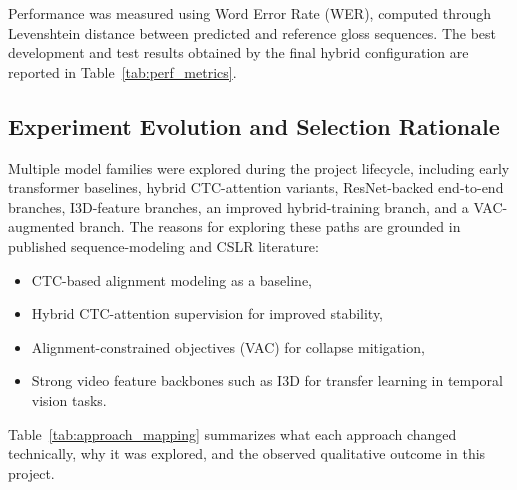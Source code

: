 Performance was measured using Word Error Rate (WER), computed through Levenshtein distance between predicted and reference gloss sequences. The best development and test results obtained by the final hybrid configuration are reported in Table~\ref{tab:perf_metrics}.

\subsection{Experiment Evolution and Selection Rationale}

Multiple model families were explored during the project lifecycle, including early transformer baselines, hybrid CTC-attention variants, ResNet-backed end-to-end branches, I3D-feature branches, an improved hybrid-training branch, and a VAC-augmented branch. The reasons for exploring these paths are grounded in published sequence-modeling and CSLR literature:
\begin{itemize}
    \item CTC-based alignment modeling as a baseline,\cite{graves2006connectionist}
    \item Hybrid CTC-attention supervision for improved stability,\cite{watanabe2017hybrid,camgoz2020sign}
    \item Alignment-constrained objectives (VAC) for collapse mitigation,\cite{zhu2021visual}
    \item Strong video feature backbones such as I3D for transfer learning in temporal vision tasks.\cite{carreira2017quo}
\end{itemize}

Table~\ref{tab:approach_mapping} summarizes what each approach changed technically, why it was explored, and the observed qualitative outcome in this project.

